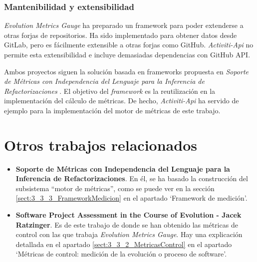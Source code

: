 
\subsubsection{Mantenibilidad y extensibilidad}

\textit{Evolution Metrics Gauge} ha preparado un framework para poder extenderse a otras forjas de repositorios. Ha sido implementado para obtener datos desde GitLab, pero es fácilmente extensible a otras forjas como GitHub. \textit{Activiti-Api} no permite esta extensibilidad e incluye demasiadas dependencias con GitHub API.

Ambos proyectos siguen la solución basada en frameworks propuesta en \textit{Soporte de Métricas con Independencia del Lenguaje para la Inferencia de Refactorizaciones} \citep{marticorena_sanchez_soporte_2005}. El objetivo del \textit{framework} es la reutilización en la implementación del cálculo de métricas. De hecho, \textit{Activiti-Api} ha servido de ejemplo para la implementación del motor de métricas de este trabajo.

\section{Otros trabajos relacionados}
\begin{itemize}
	\item \textbf{Soporte de Métricas con Independencia del Lenguaje para la Inferencia de Refactorizaciones}. En él, se ha basado la construcción del subsistema ``motor de métricas'', como se puede ver en la sección \ref{sect:3_3_3_FrameworkMedicion} en el apartado `Framework de medición'.
	
	\item \textbf{Software Project Assessment in the Course of Evolution -  Jacek Ratzinger}. Es de este trabajo de donde se han obtenido las métricas de control con las que trabaja \textit{Evolution Metrics Gauge}. Hay una explicación detallada en el apartado \ref{sect:3_3_2_MetricasControl} en el apartado `Métricas de control: medición de la evolución o proceso de software'.
\end{itemize}

